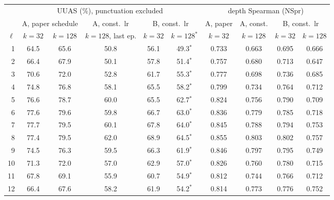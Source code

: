 \begin{tabular}{rccc|cc|cc|cc}
\toprule
 & \multicolumn{5}{c|}{UUAS (\%), punctuation excluded} & \multicolumn{4}{c}{depth Spearman (NSpr)} \\
 & \multicolumn{2}{c}{A, paper schedule} & A, const.\ lr & \multicolumn{2}{c|}{B, const.\ lr} & A, paper & A, const. & \multicolumn{2}{c}{B, const.\ lr} \\
$\ell$ & $k{=}32$ & $k{=}128$ & $k{=}128$, last ep. & $k{=}32$ & $k{=}128^\ast$ & $k{=}32$ & $k{=}128$ & $k{=}32$ & $k{=}128$ \\
\midrule
1 & 64.5 & 65.6 & 50.8 & 56.1 & 49.3$^\ast$ & 0.733 & 0.663 & 0.695 & 0.666 \\
2 & 66.4 & 67.9 & 50.1 & 57.8 & 51.4$^\ast$ & 0.757 & 0.680 & 0.713 & 0.647 \\
3 & 70.6 & 72.0 & 52.8 & 61.7 & 55.3$^\ast$ & 0.777 & 0.698 & 0.736 & 0.685 \\
4 & 74.8 & 76.8 & 58.1 & 65.5 & 58.2$^\ast$ & 0.799 & 0.734 & 0.764 & 0.712 \\
5 & 76.6 & 78.7 & 60.0 & 65.5 & 62.7$^\ast$ & 0.824 & 0.756 & 0.790 & 0.709 \\
6 & 77.6 & 79.6 & 59.8 & 66.7 & 63.0$^\ast$ & 0.836 & 0.779 & 0.785 & 0.718 \\
7 & 77.7 & 79.5 & 60.1 & 67.8 & 64.0$^\ast$ & 0.845 & 0.788 & 0.794 & 0.753 \\
\rowcolor{black!8} 8 & 77.4 & 79.5 & 62.0 & 68.9 & 64.5$^\ast$ & 0.855 & 0.803 & 0.802 & 0.757 \\
9 & 74.5 & 76.3 & 59.5 & 66.3 & 61.9$^\ast$ & 0.846 & 0.797 & 0.795 & 0.749 \\
10 & 71.3 & 72.0 & 57.0 & 62.9 & 57.0$^\ast$ & 0.826 & 0.760 & 0.780 & 0.715 \\
11 & 67.8 & 69.1 & 55.9 & 60.7 & 54.9$^\ast$ & 0.812 & 0.744 & 0.766 & 0.712 \\
12 & 66.4 & 67.6 & 58.2 & 61.9 & 54.2$^\ast$ & 0.814 & 0.773 & 0.776 & 0.752 \\
\bottomrule
\end{tabular}
